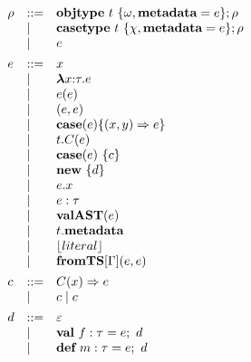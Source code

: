\begin{figure}[t]
\centering
\[
\begin{array}[t]{lll} 
\rho & \bnfdef & \keyw{objtype}~ t~ \{ \omega, \keyw{metadata}=e \}; \rho \\
     & \bnfalt & \keyw{casetype}~ t~ \{ \chi, \keyw{metadata}=e \}; \rho\\
     & \bnfalt & e
     \\[1ex]
e    & \bnfdef & x \\
     & \bnfalt & \boldsymbol\lambda x{:}\tau . e \\ %
     & \bnfalt & e(e) \\
     & \bnfalt & (e, e) \\
     & \bnfalt & \keyw{case}(e) \{(x, y) \Rightarrow e\}\\
     & \bnfalt & t.C(e) \\
     & \bnfalt & \keyw{case}(e)~\{ c \} \\
     & \bnfalt & \keyw{new}~ \{ d \}\\
     & \bnfalt & e.x \\
     & \bnfalt & e : \tau\\
     & \bnfalt & \keyw{valAST}(e) \\
     & \bnfalt & t.\keyw{metadata}\\
     & \bnfalt & \lfloor literal \rfloor \\
     & \bnfalt & \keyw{fromTS}[\Gamma](e, e)
\\[1ex]	
c    & \bnfdef & C(x) \Rightarrow e\\
     & \bnfalt & c \bnfalt c
	 \\[1ex]
d   & \bnfdef & \varepsilon \\
     & \bnfalt & \keyw{val}~ f:\tau = e;~d \\
     & \bnfalt & \keyw{def}~ m:\tau = e;~d
\\[1ex] 
\end{array}
\begin{array}[t]{lll}
~~~
\end{array}
\begin{array}[t]{lll}



\end{array}\]
\end{figure}
